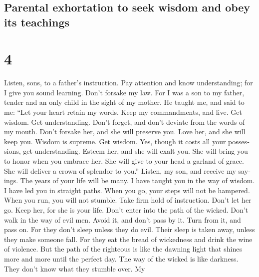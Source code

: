 \begin{paracol}{2}
\switchcolumn
\begin{otherlanguage}{english}

\hypertarget{parental-exhortation-to-seek-wisdom-and-obey-its-teachings}{%
\subsection{Parental exhortation to seek wisdom and obey its
teachings}\label{parental-exhortation-to-seek-wisdom-and-obey-its-teachings}}

\hypertarget{section-7}{%
\section{4}\label{section-7}}

 Listen, sons, to a father's instruction. Pay attention
and know understanding;  for I give you sound learning.
Don't forsake my law.  For I was a son to my father,
tender and an only child in the sight of my mother.  He
taught me, and said to me: ``Let your heart retain my words. Keep my
commandments, and live.  Get wisdom. Get understanding.
Don't forget, and don't deviate from the words of my mouth.
 Don't forsake her, and she will preserve you. Love her,
and she will keep you.  Wisdom is supreme. Get wisdom.
Yes, though it costs all your possessions, get understanding.
 Esteem her, and she will exalt you. She will bring you to
honor when you embrace her.  She will give to your head a
garland of grace. She will deliver a crown of splendor to you.''
 Listen, my son, and receive my sayings. The years of
your life will be many.  I have taught you in the way of
wisdom. I have led you in straight paths.  When you go,
your steps will not be hampered. When you run, you will not stumble.
 Take firm hold of instruction. Don't let her go. Keep
her, for she is your life.  Don't enter into the path of
the wicked. Don't walk in the way of evil men.  Avoid it,
and don't pass by it. Turn from it, and pass on.  For
they don't sleep unless they do evil. Their sleep is taken away, unless
they make someone fall.  For they eat the bread of
wickedness and drink the wine of violence.  But the path
of the righteous is like the dawning light that shines more and more
until the perfect day.  The way of the wicked is like
darkness. They don't know what they stumble over.  My

\end{otherlanguage}
\end{paracol}
